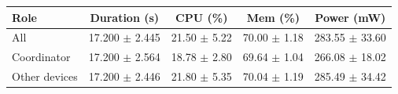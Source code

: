 \begin{tabular}{lcccc}
\hline
\textbf{Role} & \textbf{Duration (s)} & \textbf{CPU (\%)} & \textbf{Mem (\%)} & \textbf{Power (mW)} \\
\hline
All & 17.200 $\pm$ 2.445 & 21.50 $\pm$ 5.22 & 70.00 $\pm$ 1.18 & 283.55 $\pm$ 33.60 \\
Coordinator & 17.200 $\pm$ 2.564 & 18.78 $\pm$ 2.80 & 69.64 $\pm$ 1.04 & 266.08 $\pm$ 18.02 \\
Other devices & 17.200 $\pm$ 2.446 & 21.80 $\pm$ 5.35 & 70.04 $\pm$ 1.19 & 285.49 $\pm$ 34.42 \\
\hline
\end{tabular}
